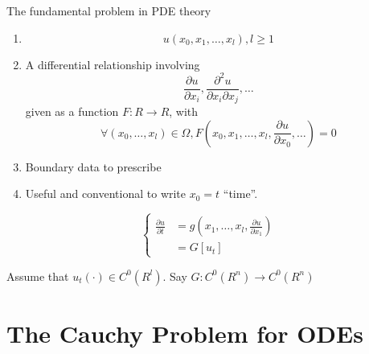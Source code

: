 The fundamental problem in PDE theory


\begin{enumerate}
\item \begin{equation}
  \label{eq:4}
  u(x_{0}, x_{1}, \dots, x_{l}), l \geq 1
\end{equation} 
\item A differential relationship involving
\begin{equation}
  \label{eq:5}
  \frac{\partial u}{\partial x_{i}}, \frac{\partial^{2} u}{\partial
    x_{i} \partial x_{j}}, \dots
\end{equation} given as a function $F: R \rightarrow R$, with
\begin{equation}
  \label{eq:6}
  \forall (x_{0}, \dots, x_{l}) \in \Omega, F(x_{0}, x_{1}, \dots, x_{l},
      \frac{\partial u}{\partial x_{0}}, \dots) = 0
\end{equation}

\item Boundary data to prescribe
\item Useful and conventional to write $x_{0} = t$ ``time''.
\end{enumerate}

\begin{equation}
  \label{eq:7}
  \begin{cases}
    \frac{\partial u}{\partial t} &= g(x_{1}, \dots, x_{l},
    \frac{\partial u}{\partial x_{1}}) \\
    &= G[u_{t}]
  \end{cases}
\end{equation}

Assume that $u_{t}(\cdot) \in C^{0}(R^{l})$.    Say $G: C^{0}(R^{n})
\rightarrow C^{0}(R^{n})$ 


\section{The Cauchy Problem for ODEs}
\label{sec:cauchy-problem-odes}

